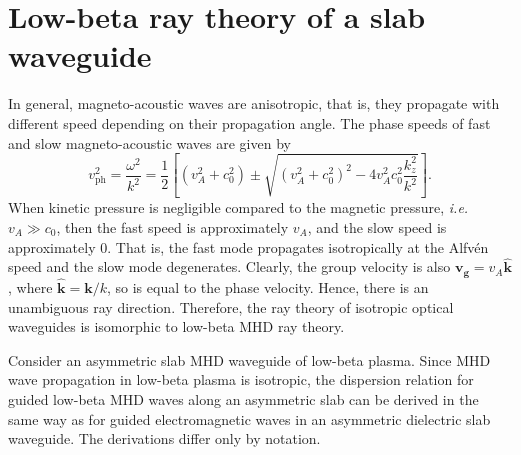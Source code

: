 	
	\section{Low-beta ray theory of a slab waveguide}
	\label{sec: low beta}
	
	In general, magneto-acoustic waves are anisotropic, that is, they propagate with different speed depending on their propagation angle. The phase speeds of fast and slow magneto-acoustic waves are given by
	\begin{equation}
	v_\mathrm{ph}^2 = \frac{\omega^2}{k^2} = \frac{1}{2}\left[ (v_A^2 + c_0^2) \pm \sqrt{(v_A^2 + c_0^2)^2 - 4v_A^2c_0^2\frac{k_z^2}{k^2}} \right]. \label{MHD DR}
	\end{equation}
	When kinetic pressure is negligible compared to the magnetic pressure, \textit{i.e.} $v_A \gg c_0$, then the fast speed is approximately $v_A$, and the slow speed is approximately $0$. That is, the fast mode propagates isotropically at the Alfv\'{e}n speed and the slow mode degenerates. Clearly, the group velocity is also $\mathbf{v_g} = v_A \mathbf{\widehat{k}}$, where $\mathbf{\widehat{k}} = \mathbf{k}/k$, so is equal to the phase velocity. Hence, there is an unambiguous ray direction. Therefore, the ray theory of isotropic optical waveguides is isomorphic to low-beta MHD ray theory.
	
	Consider an asymmetric slab MHD waveguide of low-beta plasma. Since MHD wave propagation in low-beta plasma is isotropic, the dispersion relation for guided low-beta MHD waves along an asymmetric slab can be derived in the same way as for guided electromagnetic waves in an asymmetric dielectric slab waveguide. The derivations differ only by notation.
	

